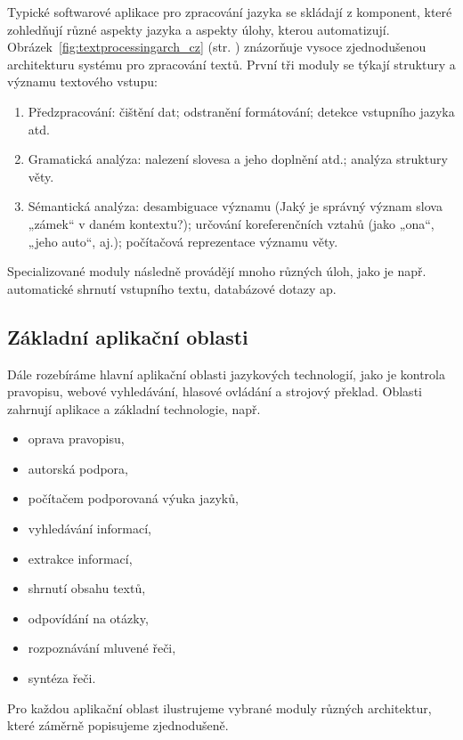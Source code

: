 \begin{multicols}{2}
Typické softwarové aplikace pro zpracování jazyka se skládají z komponent, které zohledňují různé aspekty jazyka a aspekty úlohy, kterou automatizují. Obrázek~\ref{fig:textprocessingarch_cz} (str. \pageref{fig:textprocessingarch_cz}) znázorňuje vysoce zjednodušenou architekturu systému pro zpracování textů. První tři moduly se týkají struktury a významu textového vstupu:
\begin{enumerate}
  \item Předzpracování: čištění dat; odstranění formátování; detekce vstupního jazyka atd.
  \item Gramatická analýza: nalezení slovesa a jeho doplnění atd.; analýza struktury věty.
  \item Sémantická analýza: desambiguace významu (Jaký je správný význam slova „zámek“ v daném kontextu?); určování koreferenčních vztahů (jako „ona“, „jeho auto“, aj.); počítačová reprezentace významu věty.
\end{enumerate}
Specializované moduly následně provádějí mnoho různých úloh, jako je např. automatické shrnutí vstupního textu, databázové dotazy ap.

\subsection{Základní aplikační oblasti}

Dále rozebíráme hlavní aplikační oblasti jazykových technologií, jako je kontrola pravopisu, webové vyhledávání, hlasové ovládání a strojový překlad. Oblasti zahrnují aplikace a základní technologie, např.
\begin{itemize}
  \item oprava pravopisu,
  \item autorská podpora,
  \item počítačem podporovaná výuka jazyků,
  \item vyhledávání informací,
  \item extrakce informací,
  \item shrnutí obsahu textů,
  \item odpovídání na otázky,
  \item rozpoznávání mluvené řeči,
  \item syntéza řeči.
\end{itemize}
Pro každou aplikační oblast ilustrujeme vybrané moduly různých architektur, které záměrně popisujeme zjednodušeně.


\end{multicols}

